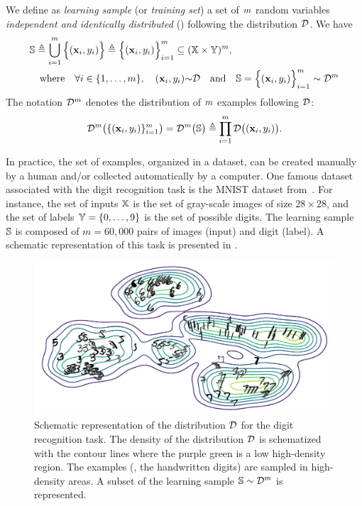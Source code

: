 \begin{definition}
We define as {\it learning sample} (or {\it training set}) a set of $\m$ random variables {\it independent and identically distributed} (\iid) following the distribution $\D$.
We have
\begin{align*}
    &\S \defeq \bigcup_{i=1}^{\m}\Big\{ (\x_i, \y_i) \Big\}  \defeq \Big\{ (\x_i, \y_i) \Big\}_{i=1}^{\m}\subseteq (\X\times\Y)^\m,\\
    &\quad\text{where}\quad \forall i\in\{1,\dots,\m\},\quad (\x_i, \y_i){\sim}\D  \quad\text{and}\quad \S = \Big\{ (\x_i, \y_i) \Big\}_{i=1}^{\m} \sim\D^{\m}
\end{align*}
The notation $\D^\m$ denotes the distribution of $\m$ examples following $\D$: 
\begin{align*}
    \D^\m\big(\{ (\x_i, \y_i)\}_{i=1}^{\m}\big) = \D^\m\big(\S\big) \defeq \prod_{i=1}^\m\D\big((\x_i, \y_i)\big).
\end{align*}
\end{definition}

In practice, the set of examples, organized in a dataset, can be created manually by a human and/or collected automatically by a computer.
One famous dataset associated with the digit recognition task is the MNIST dataset from~\citet{LeCunCortesBurges1998}.
For instance, the set of inputs $\X$ is the set of gray-scale images of size $28{\times}28$, and the set of labels $\Y=\{0, \dots, 9\}$ is the set of possible digits.
The learning sample $\S$ is composed of $m=60{,}000$ pairs of images (input) and digit (label).
A schematic representation of this task is presented in .

\begin{figure}[H]
    \centering
    \includegraphics[width=\textwidth]{chapter_1/figures/distribution.pdf}
    \caption[Schematic Representation of a Data Distribution]{Schematic representation of the distribution $\D$ for the digit recognition task.
    The density of the distribution $\D$ is schematized with the contour lines where the purple \resp green is a low \resp high-density region.
    The examples (\ie, the handwritten digits) are sampled in high-density areas.
    A subset of the learning sample $\S\sim\D^\m$ is represented.}
    \label{chap:intro:fig:distribution}
\end{figure}


